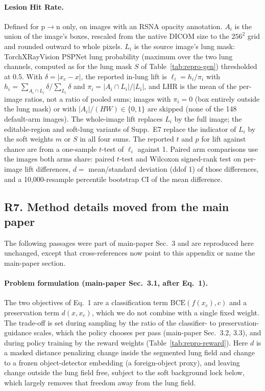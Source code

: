 \paragraph{Lesion Hit Rate.} Defined for p$\to$n only, on images with an RSNA opacity annotation. $A_i$ is the union of the image's boxes, rescaled from the native DICOM size to the $256^2$ grid and rounded outward to whole pixels. $L_i$ is the source image's lung mask: TorchXRayVision PSPNet lung probability (maximum over the two lung channels, computed as for the lung mask $S$ of Table~\ref{tab:repro-gen}) thresholded at 0.5. With $\delta = |x_c - x|$, the reported in-lung lift is $\ell_i = h_i / \pi_i$ with $h_i = \sum_{A_i \cap L_i} \delta / \sum_{L_i} \delta$ and $\pi_i = |A_i \cap L_i| / |L_i|$, and LHR is the mean of the per-image ratios, not a ratio of pooled sums; images with $\pi_i = 0$ (box entirely outside the lung mask) or with $|A_i| / (HW) \in \{0, 1\}$ are skipped (none of the 148 default-arm images). The whole-image lift replaces $L_i$ by the full image; the editable-region and soft-lung variants of Supp.~E7 replace the indicator of $L_i$ by the soft weights $m$ or $S$ in all four sums. The reported $t$ and $p$ for lift against chance are from a one-sample $t$-test of $\ell_i$ against 1. Paired arm comparisons use the images both arms share: paired $t$-test and Wilcoxon signed-rank test on per-image lift differences, $d = $ mean$/$standard deviation (ddof 1) of those differences, and a 10{,}000-resample percentile bootstrap CI of the mean difference.

\subsection*{R7. Method details moved from the main paper}
\label{sec:repro-moved-method}

The following passages were part of main-paper Sec.~3 and are reproduced here unchanged, except that cross-references now point to this appendix or name the main-paper section.

\paragraph{Problem formulation (main-paper Sec.~3.1, after Eq.~1).} The two objectives of Eq.~1 are a classification term $\mathrm{BCE}(f(x_c), c)$ and a preservation term $d(x, x_c)$, which we do not combine with a single fixed weight. The trade-off is set during sampling by the ratio of the classifier- to preservation-guidance scales, which the policy chooses per pass (main-paper Sec.~3.2, 3.3), and during policy training by the reward weights (Table~\ref{tab:repro-reward}). Here $d$ is a masked distance penalizing change inside the segmented lung field and change to a frozen object-detector embedding (a foreign-object proxy), and leaving change outside the lung field free, subject to the soft background lock below, which largely removes that freedom away from the lung field.

